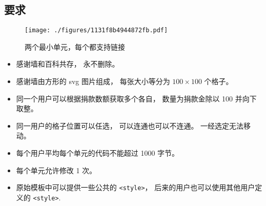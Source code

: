 
\subsection{要求}

\begin{figure}[ht]
\centering
\texttt{[image: ./figures/1131f8b4944872fb.pdf]}
\caption{两个最小单元，每个都支持链接} \label{fig_thanks_1}
\end{figure}

\begin{itemize}
\item 感谢墙和百科共存， 永不删除。
\item 感谢墙由方形的 svg 图片组成， 每张大小等分为 $100\times 100$ 个格子。
\item 同一个用户可以根据捐款数额获取多个各自， 数量为捐款金除以 100 并向下取整。
\item 同一用户的格子位置可以任选， 可以连通也可以不连通。 一经选定无法移动。
\item 每个用户平均每个单元的代码不能超过 1000 字节。
\item 每个单元允许修改 1 次。
\item 原始模板中可以提供一些公共的 \verb`<style>`， 后来的用户也可以使用其他用户定义的 \verb`<style>`.
\end{itemize}


